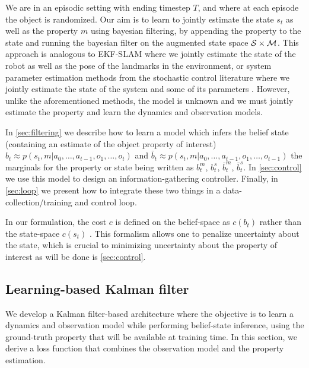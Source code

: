 \documentclass[anon]{l4dc2024}
\begin{document}
We are in an episodic setting with ending timestep $T$, and where at each episode the object is randomized.
Our aim is to learn to jointly estimate the state $s_t$ as well as the property $m$ using bayesian filtering, by  appending the property to the state and running the bayesian filter on the augmented state space $\mathcal{S} \times \mathcal{M}$.
This approach is analogous to EKF-SLAM \citep{ekfslam} where we jointly estimate the state of the robot as well as the pose of the landmarks in the environment, or system parameter estimation methods from the stochastic control literature where we jointly estimate the state of the system and some of its parameters \citep[][\S 4.7]{stengel1994optimal}. However, unlike the aforementioned methods,  the model is unknown and we must jointly estimate the property and  learn the dynamics and observation models.


\begin{sloppypar}
    In \autoref{sec:filtering} we  describe how to learn a model which infers the belief state (containing an estimate of the object property of interest)
    $b_t \approx p(s_t, m|a_0, \dots, a_{t-1}, o_1, \dots, o_t)$
    and $\bar{b}_t \approx p(s_t, m|a_0, \dots, a_{t-1}, o_1, \dots, o_{t-1})$ the marginals for the property or state being written as $b_t^m$, $b_t^s$, $\bar{b}_t^m$, $\bar{b}_t^s$. In \autoref{sec:control} we use this model to design an information-gathering controller.
    Finally, in \autoref{sec:loop} we present how to integrate these two things in a data-collection/training and control loop.
\end{sloppypar}

In our formulation, the cost $c$ is defined on the belief-space as $c(b_t)$ rather than the state-space $c(s_t)$ \citep{rhopomdp}.
This formalism allows one to penalize uncertainty about the state, which is crucial to minimizing uncertainty about the property of interest as will be done is \autoref{sec:control}.

\subsection{Learning-based Kalman filter}
\label{sec:filtering}
We develop a Kalman filter-based architecture where the objective is to learn a dynamics and observation model while performing belief-state inference, using the ground-truth property that will be available at training time.
In this section, we derive a loss function that combines the observation model and the property estimation.
\end{document}
